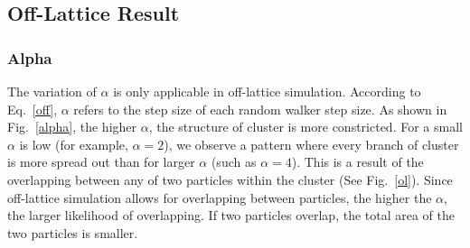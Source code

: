 \documentclass[aps,preprint,groupedaddress,letterpaper]{revtex4-1}
\begin{document}
\subsection{Off-Lattice Result}
\subsubsection{Alpha}

The variation of $\alpha$ is only applicable in off-lattice simulation. According to Eq.~\ref{off}, $\alpha$ refers to the step size of each random walker step size. As shown in Fig.~\ref{alpha}, the higher $\alpha$, the structure of cluster is more constricted. For a small $\alpha$ is low (for example, $\alpha = 2$), we observe a pattern where every branch of cluster is more spread out than for larger $\alpha$ (such as $\alpha = 4$). This is a result of the overlapping between any of two particles within the cluster (See Fig.~\ref{ol}). Since off-lattice simulation allows for overlapping between particles, the higher the $\alpha$, the larger likelihood of overlapping. If two particles overlap, the total area of the two particles is smaller.
\end{document}
